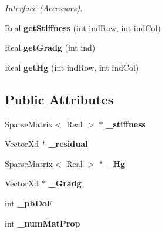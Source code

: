 \begin{DoxyCompactItemize}
\begin{DoxyCompactList}\small\item\em Interface (Accessors). \item\end{DoxyCompactList}\item 
\hypertarget{structvoom_1_1_eigen_elliptic_result_abb3450dd9bb60bf661f4710324085b10}{
Real {\bfseries getStiffness} (int indRow, int indCol)}
\label{structvoom_1_1_eigen_elliptic_result_abb3450dd9bb60bf661f4710324085b10}

\item 
\hypertarget{structvoom_1_1_eigen_elliptic_result_a3f9cd0fed3c20c7eb638659f882377f6}{
Real {\bfseries getGradg} (int ind)}
\label{structvoom_1_1_eigen_elliptic_result_a3f9cd0fed3c20c7eb638659f882377f6}

\item 
\hypertarget{structvoom_1_1_eigen_elliptic_result_a2dd2e46086c7ab0032909137acb93f26}{
Real {\bfseries getHg} (int indRow, int indCol)}
\label{structvoom_1_1_eigen_elliptic_result_a2dd2e46086c7ab0032909137acb93f26}

\end{DoxyCompactItemize}
\subsection*{Public Attributes}
\begin{DoxyCompactItemize}
\item 
\hypertarget{structvoom_1_1_eigen_elliptic_result_aaba0125035e86c4baed44f66b9bfa6d1}{
SparseMatrix$<$ Real $>$ $\ast$ {\bfseries \_\-stiffness}}
\label{structvoom_1_1_eigen_elliptic_result_aaba0125035e86c4baed44f66b9bfa6d1}

\item 
\hypertarget{structvoom_1_1_eigen_elliptic_result_a3d9f5cffe2edee3c1f2a0a7521de5232}{
VectorXd $\ast$ {\bfseries \_\-residual}}
\label{structvoom_1_1_eigen_elliptic_result_a3d9f5cffe2edee3c1f2a0a7521de5232}

\item 
\hypertarget{structvoom_1_1_eigen_elliptic_result_a84d0ee3ba7576b0fb47d7178468ce278}{
SparseMatrix$<$ Real $>$ $\ast$ {\bfseries \_\-Hg}}
\label{structvoom_1_1_eigen_elliptic_result_a84d0ee3ba7576b0fb47d7178468ce278}

\item 
\hypertarget{structvoom_1_1_eigen_elliptic_result_af4744cf8a5b94c2a0f181e028584597a}{
VectorXd $\ast$ {\bfseries \_\-Gradg}}
\label{structvoom_1_1_eigen_elliptic_result_af4744cf8a5b94c2a0f181e028584597a}

\item 
\hypertarget{structvoom_1_1_eigen_elliptic_result_afbe730f7ab5c8d36f1cb20c06e509d4a}{
int {\bfseries \_\-pbDoF}}
\label{structvoom_1_1_eigen_elliptic_result_afbe730f7ab5c8d36f1cb20c06e509d4a}

\item 
\hypertarget{structvoom_1_1_eigen_elliptic_result_a5bb9f9b78c3f5e7ae4f5323252cffb67}{
int {\bfseries \_\-numMatProp}}
\label{structvoom_1_1_eigen_elliptic_result_a5bb9f9b78c3f5e7ae4f5323252cffb67}

\end{DoxyCompactItemize}


